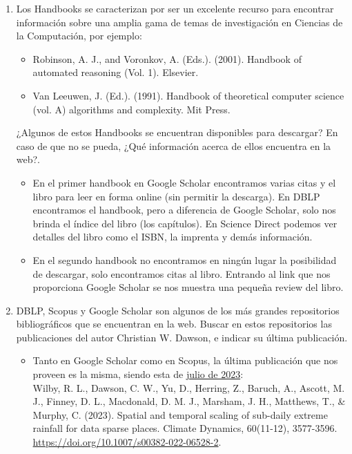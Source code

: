 \documentclass[]{article}
\begin{document}
\begin{enumerate}
	    \item Los Handbooks se caracterizan por ser un excelente recurso para encontrar información sobre una amplia gama de temas de investigación en Ciencias de la Computación, por ejemplo:
	\begin{itemize}
		\item Robinson, A. J., and Voronkov, A. (Eds.). (2001). Handbook of automated reasoning (Vol. 1). Elsevier.
		\item Van Leeuwen, J. (Ed.). (1991). Handbook of theoretical computer science (vol. A) algorithms and complexity. Mit Press.
	\end{itemize}
	¿Algunos de estos Handbooks se encuentran disponibles para descargar? En caso de que no se pueda, ¿Qué información acerca de ellos encuentra en la web?.
	\begin{itemize}
		\item En el primer handbook en Google Scholar encontramos varias citas y el libro para leer en forma online (sin permitir la descarga). En DBLP encontramos el handbook, pero a diferencia de Google Scholar, solo nos brinda el índice del libro (los capítulos). En Science Direct podemos ver detalles del libro como el ISBN, la imprenta y demás información.
		
		\item En el segundo handbook no encontramos en ningún lugar la posibilidad de descargar, solo encontramos citas al libro. Entrando al link que nos proporciona Google Scholar se nos muestra una pequeña review del libro.
	\end{itemize}
	
	\item DBLP, Scopus y Google Scholar son algunos de los más grandes repositorios bibliográficos que se encuentran en la web. Buscar en estos repositorios las publicaciones del autor Christian W. Dawson, e indicar su última publicación.
	\begin{itemize}
		\item Tanto en Google Scholar como en Scopus, la última publicación que nos proveen es la misma, siendo esta de \href{https://scholar.google.com/citations?view_op=view_citation&hl=es&user=QGP7CAsAAAAJ&sortby=pubdate&citation_for_view=QGP7CAsAAAAJ:5ugPr518TE4C}{julio de 2023}: \\
		Wilby, R. L., Dawson, C. W., Yu, D., Herring, Z., Baruch, A., Ascott, M. J., Finney, D. L., Macdonald, D. M. J., Marsham, J. H., Matthews, T., \& Murphy, C. (2023). Spatial and temporal scaling of sub-daily extreme rainfall for data sparse places. Climate Dynamics, 60(11-12), 3577-3596. \href{https://doi.org/10.1007/s00382-022-06528-2}{https://doi.org/10.1007/s00382-022-06528-2}.
		

\end{itemize}
\end{enumerate}
\end{document}
